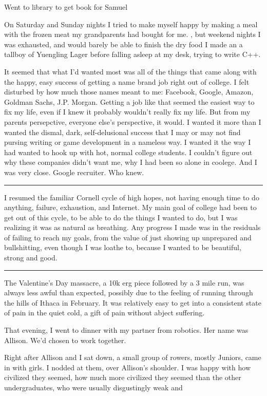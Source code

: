 Went to library to get book for Samuel

On Saturday and Sunday nights I tried to make myself happy by making a meal with
the frozen meat my grandparents had bought for me.  , but weekend nights I was exhausted, and would barely
be able to finish the dry food I made an a tallboy of Yuengling Lager before
falling asleep at my desk, trying to write C++.

It seemed that what I'd wanted most was all of the things that came along with
the happy, easy success of getting a name brand job right out of college.  I
felt disturbed by how much those names meant to me: Facebook, Google, Amazon,
Goldman Sachs, J.P. Morgan.  Getting a job like that seemed the easiest way to
fix my life, even if I knew it probably wouldn't really fix my life.  But from
my parents persepctive, everyone else's perspective, it would.  I wanted it more
than I wanted the dismal, dark, self-delusional success that I may or may not
find pursing writing or game development in a nameless way.  I wanted it the way
I had wanted to hook up with hot, normal college students.  I couldn't figure
out why these companies didn't want me, why I had been so alone in coolege.  And
I was very close.  Google recruiter.  Who knew.

\plainfancybreak{12pt}{2}{* * *}

I resumed the familiar Cornell cycle of high hopes, not having enough time to do
anything, failure, exhaustion, and Internet.  My main goal of college had been
to get out of this cycle, to be able to do the things I wanted to do, but I was
realizing it was as natural as breathing.  Any progress I made was in the
residuals of failing to reach my goals, from the value of just showing up
unprepared and bullshitting, even though I was loathe to, because I wanted to be
beautiful, strong and good.

\plainfancybreak{12pt}{2}{* * *}

The Valentine's Day massacre, a 10k erg piece followed by a 3 mile run, was
always less awful than expected, possibly due to the feeling of running through
the hills of Ithaca in February.  It was relatively easy to get into a
consistent state of pain in the quiet cold, a gift of pain without abject
suffering. 

That evening, I went to dinner with my partner from robotics.  Her name was
Allison.  We'd chosen to work together.  

Right after Allison and I sat down, a small group of rowers, mostly Juniors,
came in with girls.  I nodded at them, over Allison's shoulder.  I was happy
with how civilized they seemed, how much more civilized they seemed than the
other undergraduates, who were usually disgustingly weak and


